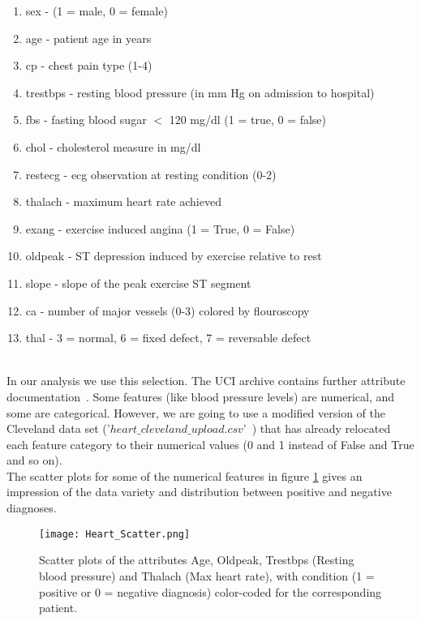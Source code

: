 \documentclass[reprint,english,notitlepage]{revtex4-1}  %
\begin{document}
\begin{enumerate}
    \item sex - (1 = male, 0 = female)
    \item age - patient age in years
    \item cp - chest pain type (1-4)
    \item trestbps - resting blood pressure (in mm Hg on admission to hospital)
    \item fbs - fasting blood sugar $<$ 120 mg/dl (1 = true, 0 = false)
    \item chol - cholesterol measure in mg/dl 
    \item restecg - ecg observation at resting condition (0-2)
    \item thalach - maximum heart rate achieved
    \item exang - exercise induced angina (1 = True, 0 = False)
    \item oldpeak - ST depression induced by exercise relative to rest
    \item slope - slope of the peak exercise ST segment
    \item ca - number of major vessels (0-3) colored by flouroscopy
    \item thal - 3 = normal, 6 = fixed defect, 7 = reversable defect
\end{enumerate}
\vspace{3mm}
\\ 
In our analysis we use this selection. The UCI archive contains further attribute documentation~\cite{heart}. Some features (like blood pressure levels) are numerical, and some are categorical. However, we are going to use a modified version of the Cleveland data set ('$heart\_cleveland\_upload.csv$'~\cite{heart_csv}) that has already relocated each feature category to their numerical values (0 and 1 instead of False and True and so on).
\vspace{3mm}
\\
The scatter plots for some of the numerical features in figure \ref{fig:scatter1} gives an impression of the data variety and distribution between positive and negative diagnoses. 
\begin{figure}[h!]
    \centering
    \texttt{[image: Heart\_Scatter.png]}
    \caption{Scatter plots of the attributes Age, Oldpeak, Trestbps (Resting blood pressure) and Thalach (Max heart rate), with condition (1 = positive or 0 = negative diagnosis) color-coded for the corresponding patient.}
    \label{fig:scatter1}
\end{figure}
\end{document}
